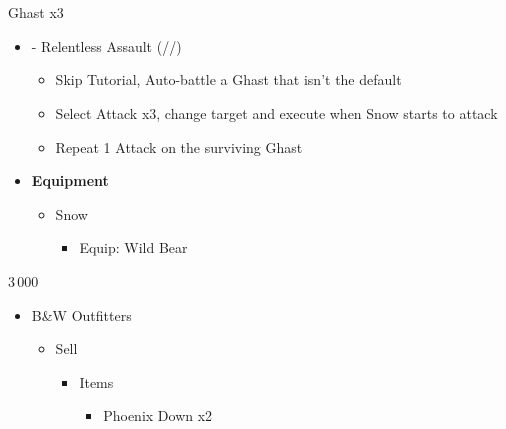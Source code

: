 \chapter[Chapter 3]{}

\renewcommand{\first}{[1] - Relentless Assault (\com/\rav/\rav)}
\begin{multicols}{2}

  \begin{battle}[0:11]{Ghast x3}
    \begin{itemize}
      \item \first
            \begin{itemize}
              \item Skip Tutorial, Auto-battle a Ghast that isn't the default
              \item Select Attack x3, change target and execute when Snow starts to attack
              \item Repeat 1 Attack on the surviving Ghast
            \end{itemize}
    \end{itemize}
  \end{battle}
  \begin{menu}
    \begin{itemize}
      \item \textbf{Equipment}
            \begin{itemize}
              \item Snow
                    \begin{itemize}
                      \item Equip: Wild Bear
                    \end{itemize}
            \end{itemize}
    \end{itemize}
  \end{menu}
  \begin{shop}{3\,000}
    \begin{itemize}
      \item B\&W Outfitters
            \begin{itemize}
              \item Sell
                    \begin{itemize}
                      \item Items
                            \begin{itemize}
                              \item Phoenix Down x2
                            \end{itemize}

\end{itemize}
\end{itemize}
\end{itemize}
\end{shop}
\end{multicols}
